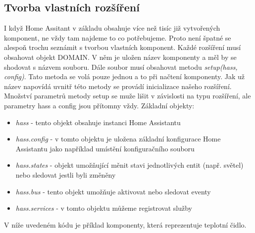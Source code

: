 \documentclass[a4paper,12pt,czech,bibliography=totoc]{scrbook}
\begin{document}
	\subsection{Tvorba vlastních rozšíření}	
		I když Home Assitant v základu obsahuje více než tisíc již vytvořených komponent, ne vždy tam najdeme to co potřebujeme. Proto není špatné se alespoň trochu seznámit s tvorbou vlastních komponent.  Každé rozšíření musí obsahovat objekt DOMAIN. V něm je uložen název komponenty a měl by se shodovat s názvem souboru. Dále soubor musí obsahovat metodu \textit{setup(hass, config)}. Tato metoda se volá pouze jednou a to při načtení komponenty. Jak už název napovídá uvnitř této metody se provádí inicializace našeho rozšíření. Množství parametrů metody setup se muže lišit v závislosti na typu rozšíření, ale parametry hass a config jsou přítomny vždy.
		\cite{HA_custom}
		\newline
		Základní objekty:
		\begin{itemize}
			\item \textit{hass} - tento objekt obsahuje instanci Home Assistantu
			\item \textit{hass.config} - v tomto objektu je uložena základní konfigurace Home Assistantu jako například umístění konfiguračního souboru
			\item \textit{hass.states} - objekt umožňující měnit stavi jednotlivých entit (např. světel) nebo sledovat jestli byli změněny
			\item \textit{hass.bus} - tento objekt umožňuje aktivovat nebo sledovat eventy
			\item \textit{hass.services} - v tomto objektu můžeme registrovat služby
		\end{itemize}
V níže uvedeném kódu je příklad komponenty, která reprezentuje teplotní čidlo.
\newpage
\end{document}
